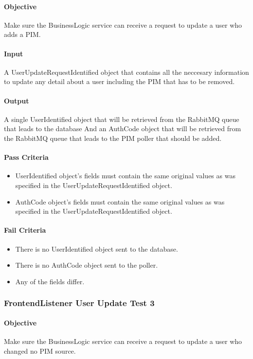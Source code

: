 \documentclass[hidelinks,english]{article}
\begin{document}
				\paragraph{Objective} Make sure the BusinessLogic service can receive a request to update a user who adds a PIM.
				\paragraph{Input} A UserUpdateRequestIdentified object that contains all the neccesary information to update any detail about a user including the PIM that has to be removed.
				\paragraph{Output} A single UserIdentified object that will be retrieved from the RabbitMQ queue that leads to the database And an AuthCode object that  will be retrieved from the RabbitMQ queue that leads to the PIM poller that should be added.
				\paragraph{Pass Criteria}
				\begin{itemize}
					\item UserIdentified object's fields must contain the same original values as was specified in the UserUpdateRequestIdentified object.
					\item AuthCode object's fields must contain the same original values as was specified in the UserUpdateRequestIdentified object.
				\end{itemize}
				\paragraph{Fail Criteria}
				\begin{itemize}
					\item There is no UserIdentified object sent to the database.
					\item There is no AuthCode object sent to the poller.
					\item Any of the fields differ.
				\end{itemize}
			
			\subsubsection{FrontendListener User Update Test 3}\label{businessfrontendlistenerupdatetest3}
				\paragraph{Objective} Make sure the BusinessLogic service can receive a request to update a user who changed no PIM source.
\end{document}
